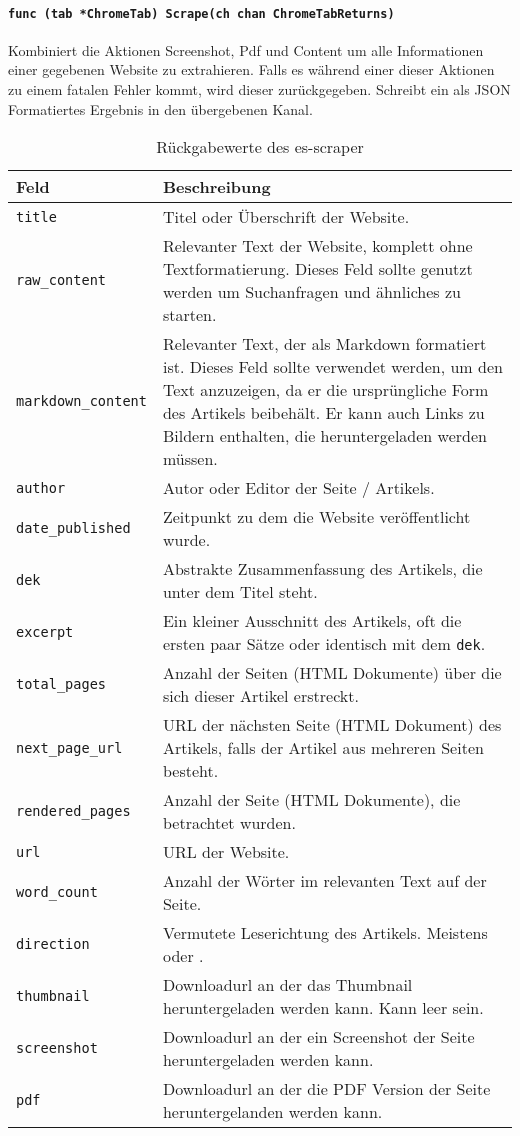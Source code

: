 \paragraph{\texttt{func (tab *ChromeTab) Scrape(ch chan ChromeTabReturns)}}
Kombiniert die Aktionen Screenshot, Pdf und Content um alle Informationen einer gegebenen Website zu extrahieren. Falls es während einer dieser Aktionen zu einem fatalen Fehler kommt, wird dieser zurückgegeben. Schreibt ein als JSON Formatiertes Ergebnis in den übergebenen Kanal. 
\begin{table}[h]
	\centering
	\begin{tabu}{lX}
		\toprule
		Feld & Beschreibung \\ \midrule
		\texttt{title} & Titel oder Überschrift der Website. \\
		\texttt{raw\_content} & Relevanter Text der Website, komplett ohne Textformatierung. Dieses Feld sollte genutzt werden um Suchanfragen und ähnliches zu starten. \\
		\texttt{markdown\_content} & Relevanter Text, der als Markdown \cite{markdown2016} formatiert ist. Dieses Feld sollte verwendet werden, um den Text anzuzeigen, da er die ursprüngliche Form des Artikels beibehält. Er kann auch Links zu Bildern enthalten, die heruntergeladen werden müssen. \\
		\texttt{author} & Autor oder Editor der Seite / Artikels. \\
		\texttt{date\_published} & Zeitpunkt zu dem die Website veröffentlicht wurde. \\
		\texttt{dek} & Abstrakte Zusammenfassung des Artikels, die unter dem Titel steht. \\
		\texttt{excerpt} & Ein kleiner Ausschnitt des Artikels, oft die ersten paar Sätze oder identisch mit dem \texttt{dek}. \\
		\texttt{total\_pages} & Anzahl der Seiten (HTML Dokumente) über die sich dieser Artikel erstreckt.\\
		\texttt{next\_page\_url} & URL der nächsten Seite (HTML Dokument) des Artikels, falls der Artikel aus mehreren Seiten besteht. \\
		\texttt{rendered\_pages} & Anzahl der Seite (HTML Dokumente), die betrachtet wurden. \\
		\texttt{url} & URL der Website. \\
		\texttt{word\_count} & Anzahl der Wörter im relevanten Text auf der Seite. \\
		\texttt{direction} & Vermutete Leserichtung des Artikels. Meistens  oder . \\
		\texttt{thumbnail} & Downloadurl an der das Thumbnail heruntergeladen werden kann. Kann leer sein.\\
		\texttt{screenshot} & Downloadurl an der ein Screenshot der Seite heruntergeladen werden kann.  \\
		\texttt{pdf} & Downloadurl an der die PDF Version der Seite heruntergelanden werden kann.  \\
		\bottomrule
	\end{tabu}
	\caption{Rückgabewerte des es-scraper}
	\label{scraper:table:scraper}
\end{table}


